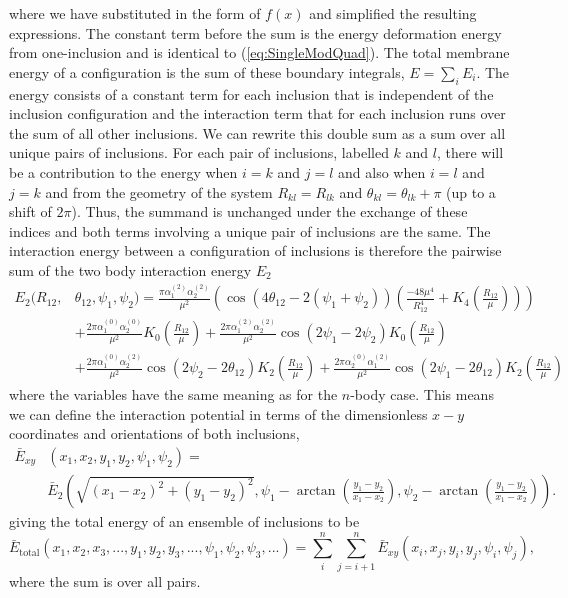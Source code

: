  where we have substituted in the form of $f(x)$ and simplified the resulting expressions. The constant term before the sum is the energy deformation energy from one-inclusion and is identical to (\ref{eq:SingleModQuad}). The total membrane energy of a configuration is the sum of these boundary integrals, $E = \sum_{i}E_i$. The energy consists of a constant term for each inclusion that is independent of the inclusion configuration and the interaction term that for each inclusion runs over the sum of all other inclusions. We can rewrite this double sum as a sum over all unique pairs of inclusions. For each pair of inclusions, labelled $k$ and $l$, there will be a contribution to the energy when $i=k$ and $j=l$ and also when $i=l$ and $j=k$ and from the geometry of the system $R_{kl} = R_{lk}$ and $\theta_{kl} = \theta_{lk}+\pi$ (up to a shift of $2\pi$). Thus, the summand is unchanged under the exchange of these indices and both terms involving a unique pair of inclusions are the same. The interaction energy between a configuration of inclusions is therefore the pairwise sum of the two body interaction energy $E_2$
\begin{equation}
\begin{split}
    E_2(R_{12}, &\theta_{12}, \psi_1,  \psi_2) = \frac{\pi\alpha_1^{(2)}\alpha_2^{(2)}}{\mu^2}\left(\cos\left(4\theta_{12}-2(\psi_1+\psi_2)\right)\left(\frac{-48\mu^4}{R_{12}^4}
    + K_4\left(\frac{R_{12}}{\mu}\right)\right)\right) \\
    &+ \frac{2\pi  \alpha_1^{(0)} \alpha_2^{(0)}}{\mu ^2} K_0\left(\frac{R_{12}}{\mu }\right) +\frac{2\pi\alpha_1^{(2)}\alpha_2^{(2)}}{\mu^2}\cos\left(2\psi_1-2\psi_2\right)K_0\left(\frac{R_{12}}{\mu}\right) \\
    &+ \frac{2\pi  \alpha_1^{(0)} \alpha_2^{(2)}}{\mu ^2} \cos (2\psi_2-2\theta_{12}) K_2\left(\frac{R_{12}}{\mu }\right) + \frac{2\pi  \alpha_2^{(0)} \alpha_1^{(2)}}{\mu ^2} \cos (2\psi_1-2\theta_{12}) K_2\left(\frac{R_{12}}{\mu }\right)
    \end{split}
    \label{eq:e2_r}
\end{equation}
 where the variables have the same meaning as for the $n$-body case. This means we can define the interaction potential in terms of the dimensionless $x-y$ coordinates and orientations of both inclusions,
\begin{equation}
\begin{split}
    \bar{E}_{xy}&(x_1, x_2, y_1, y_2, \psi_1, \psi_2) =\\
    &\bar{E}_2\left(\sqrt{(x_1-x_2)^2+(y_1-y_2)^2}, \psi_1- \arctan\left(\frac{y_1-y_2}{x_1-x_2}\right), \psi_2-\arctan\left(\frac{y_1-y_2}{x_1-x_2}\right)\right).
\end{split}
\label{eq:exy}
\end{equation}
giving the total energy of an ensemble of inclusions to be
\begin{equation}
    \bar{E}_{\text{total}}(x_1, x_2, x_3,..., y_1, y_2, y_3, ..., \psi_1, \psi_2, \psi_3,...) = \sum_{i}^{n}\sum_{j = i+1}^{n} \bar{E}_{xy}(x_i, x_j, y_i, y_j, \psi_i, \psi_j),
\end{equation}
where the sum is over all pairs.

